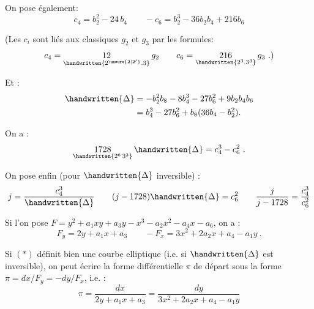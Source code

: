 
On pose également:
\[
 c_{4}=b_{2}^{2}-24\,b_{4}\qquad -c_{6}=b_{2}^{3}-36b_{2}b_{4}+216b_{6}
\]

(Les $c_{i}$ sont liés aux classiques $g_{2}$ et $g_{3}$ par les formules:
\[
 c_{4}=\underset{\handwritten{2^{\unsure{2|2'}}\mathord{.}3}}{12}\,g_{2}
 \qquad c_{6}=\underset{\handwritten{2^{3}\mathord{.}3^{3}}}{216}\,g_{3}\ .)
\]

Et :
\[
\begin{aligned}
\handwritten{\Delta}&=-b_{2}^{2}b_{8}-8b_{4}^{3}-27b_{6}^{2}+9b_{2}b_{4}b_{6}\\
&=b_{4}^{3}-27b_{6}^{2}+b_{8}(36b_{4}-b_{2}^{2}).
\end{aligned}
\]

On a :
\[
 \underset{\handwritten{2^{6}\,3^{3}}}{1728}\,\handwritten{\Delta}=c_{4}^{3}-c_{6}^{2}\ .
\]

On pose enfin (pour $\handwritten{\Delta}$ inversible) :
\[
 j=\frac{c_{4}^{3}}{\handwritten{\Delta}}\qquad
 (j-1728)\handwritten{\Delta}=c_{6}^{2}\qquad
 \frac{j}{j-1728}=\frac{c_{4}^{3}}{c_{6}^{2}}
\]

Si l'on pose $F=y^{2}+a_{1}xy+a_{3}y-x^{3}-a_{2}x^{2}-a_{4}x-a_{6}$, on a :
\[
 F_{y}=2y+a_{1}x+a_{3}\qquad -F_{x}=3x^{2}+2a_{2}x+a_{4}-a_{1}y\ .
\]

Si $(\ast)$ définit bien une courbe elliptique (i.e. si $\handwritten{\Delta}$ est inversible), on peut écrire la forme différentielle $\pi$ de départ sous la forme $\pi=dx/F_{y}=-dy/F_{x}$, i.e. :
\[
 \pi=\frac{dx}{2y+a_{1}x+a_{3}}=\frac{dy}{3x^{2}+2a_{2}x+a_{4}-a_{1}y}
\]


